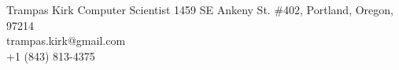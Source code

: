 \documentclass[9pt]{article}
\begin{document}
%
%
%
%

\setmainfont

\header
{\LARGE Trampas Kirk}
{\Large Computer Scientist}
{\hspace{5em}\small1459 SE Ankeny St. \#402, Portland, Oregon, 97214\\
trampas.kirk@gmail.com\\
+1 (843) 813-4375}

%
%
%
%
%
%
%
%

\end{document}
